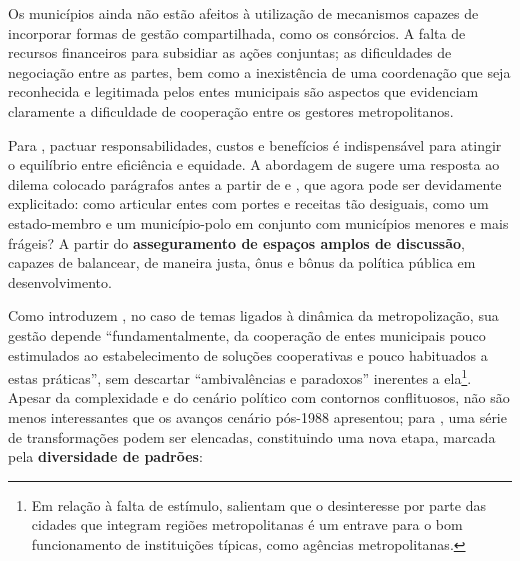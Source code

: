 \documentclass[
article,			%
11pt,				%
oneside,			%
a4paper,			%
english,			%
brazil,				%
sumario=tradicional
]{abntex2}
\begin{document}
	\begin{citacao}
		Os municípios ainda não estão afeitos à utilização de mecanismos capazes de incorporar formas de gestão compartilhada, como os consórcios. A falta de recursos financeiros para subsidiar as ações conjuntas; as dificuldades de negociação entre as partes, bem como a inexistência de uma coordenação que seja reconhecida e legitimada pelos entes municipais são aspectos que evidenciam claramente a dificuldade de cooperação entre os	gestores metropolitanos.
	\end{citacao}

	Para , pactuar responsabilidades, custos e benefícios é indispensável para atingir o equilíbrio entre eficiência e equidade. A abordagem de  sugere uma resposta ao dilema colocado parágrafos antes a partir de  e \cite[p. 104]{clementino2018a}, que agora pode ser devidamente explicitado: como articular entes com portes e receitas tão desiguais, como um estado-membro e um município-polo em conjunto com municípios menores e mais frágeis? A partir do \textbf{asseguramento de espaços amplos de discussão}, capazes de balancear, de maneira justa, ônus e bônus da política pública em desenvolvimento.

	Como introduzem , no caso de temas ligados à dinâmica da metropolização, sua gestão depende ``fundamentalmente, da cooperação de entes municipais pouco estimulados ao estabelecimento de soluções cooperativas e pouco habituados a estas práticas'', sem descartar ``ambivalências e paradoxos'' inerentes a ela\footnote{Em relação à falta de estímulo,  salientam que o desinteresse por parte das cidades que integram regiões metropolitanas é um entrave para o bom funcionamento de instituições típicas, como agências metropolitanas.}. Apesar da complexidade e do cenário político com contornos conflituosos, não são menos interessantes que os avanços cenário pós-1988 apresentou; para , uma série de transformações podem ser elencadas, constituindo uma nova etapa, marcada pela \textbf{diversidade de padrões}:
	
\end{document}
